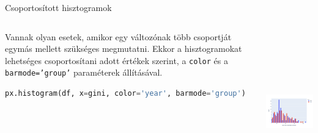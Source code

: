 \documentclass[english, aspectratio=169]{beamer}
\begin{document}
\begin{frame}[fragile]{Csoportosított hisztogramok}
	\begin{columns}
		\begin{column}{.5\textwidth}
			Vannak olyan esetek, amikor egy változónak több csoportját egymás mellett szükséges megmutatni. Ekkor a hisztogramokat lehetséges csoportosítani adott értékek szerint, a \texttt{color} és a \texttt{barmode='group'} paraméterek állításával.\par\medskip
			\begin{lstlisting}[language=python]
px.histogram(df, x=gini, color='year', barmode='group')
			\end{lstlisting}
		\end{column}
		\begin{column}{.5\textwidth}
			\begin{center}
				\includegraphics[width=7cm, height=7cm, keepaspectratio]{images/freq_6.png}
			\end{center}
		\end{column}
	\end{columns}
\end{frame}
\end{document}
